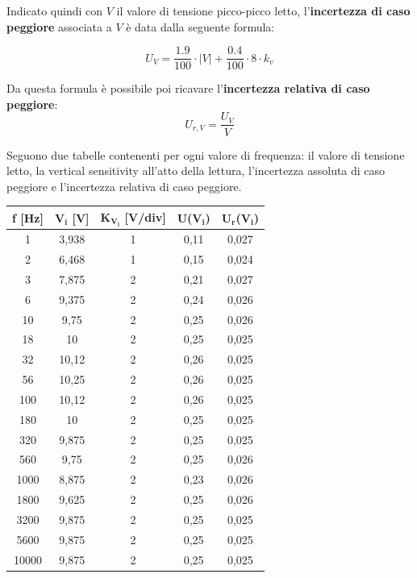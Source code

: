 Indicato quindi con $V$ il valore di tensione picco-picco letto, l'\textbf{incertezza di caso peggiore} associata a $V$ è data dalla seguente formula:

\[U_V = \frac{1.9}{100} \cdot |V| + \frac{0.4}{100} \cdot 8 \cdot k_v\]

Da questa formula è possibile poi ricavare l'\textbf{incertezza relativa di caso peggiore}:
\[U_{r,V} = \frac{U_V}{V}\]

Seguono due tabelle contenenti per ogni valore di frequenza: il valore di tensione letto, la vertical sensitivity all'atto della lettura, l'incertezza assoluta di caso peggiore e l'incertezza relativa di caso peggiore.

\begin{table}[!ht]
    \centering
    \begin{tabular}{|c|c|c|c|c|}
    \hline

        \textbf{f [Hz]} & \textbf{$\bm{V_{i}}$ [V]} & \textbf{$\bm{K_{V_i}}$ [V/div]} & \textbf{U($\bm{V_{i}}$)} & \textbf{$\bm{U_{r}}$($\bm{V_{i}}$)} \\ \hline

        1 & 3,938 & 1 & 0,11 & 0,027 \\ \hline
        2 & 6,468 & 1 & 0,15 & 0,024 \\ \hline
        3 & 7,875 & 2 & 0,21 & 0,027 \\ \hline
        6 & 9,375 & 2 & 0,24 & 0,026 \\ \hline
        10 & 9,75 & 2 & 0,25 & 0,026 \\ \hline
        18 & 10 & 2 & 0,25 & 0,025 \\ \hline
        32 & 10,12 & 2 & 0,26 & 0,025 \\ \hline
        56 & 10,25 & 2 & 0,26 & 0,025 \\ \hline
        100 & 10,12 & 2 & 0,26 & 0,025 \\ \hline
        180 & 10 & 2 & 0,25 & 0,025 \\ \hline
        320 & 9,875 & 2 & 0,25 & 0,025 \\ \hline
        560 & 9,75 & 2 & 0,25 & 0,026 \\ \hline
        1000 & 8,875 & 2 & 0,23 & 0,026 \\ \hline
        1800 & 9,625 & 2 & 0,25 & 0,026 \\ \hline
        3200 & 9,875 & 2 & 0,25 & 0,025 \\ \hline
        5600 & 9,875 & 2 & 0,25 & 0,025 \\ \hline
        10000 & 9,875 & 2 & 0,25 & 0,025 \\ \hline
    \end{tabular}
\end{table}

